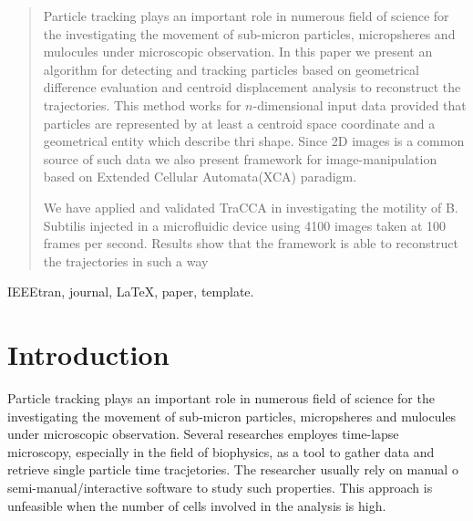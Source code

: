 \documentclass[conference]{IEEEtran}
\begin{document}
\maketitle


\begin{abstract}
Particle tracking plays an important role in numerous field of science for the investigating the movement of sub-micron particles, micropsheres and mulocules under microscopic observation. In this paper we present an algorithm for detecting and tracking particles based on geometrical difference evaluation and centroid displacement analysis to reconstruct the trajectories. 
This method works for $n$-dimensional input data provided that particles are represented by at least a centroid space coordinate and a geometrical entity which describe thri shape. 
Since 2D images is a common source of such data we also present framework for image-manipulation based on Extended Cellular Automata(XCA) paradigm.

We have applied and validated TraCCA in investigating the motility of B. Subtilis injected in a microfluidic device using 4100 images taken at 100 frames per second. 
Results show that the framework is able to reconstruct the trajectories in such a way 


\end{abstract}

\begin{IEEEkeywords}
IEEEtran, journal, \LaTeX, paper, template.
\end{IEEEkeywords}






%
\IEEEpeerreviewmaketitle

\section{Introduction}
Particle tracking plays an important role in numerous field of science for the investigating the movement of sub-micron particles, micropsheres and mulocules under microscopic observation.  Several researches employes time-lapse microscopy, especially in the field of biophysics, as a tool to gather data and retrieve single particle time tracjetories. The researcher usually rely on manual o semi-manual/interactive software to study such properties. This approach is unfeasible when the number of cells involved in the analysis is high.
\end{document}
